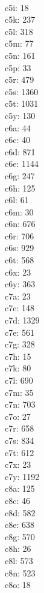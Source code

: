 \begin{multicols}{8}
  \\ c5i: 18
  \\ c5k: 237
  \\ c5l: 318
  \\ c5m: 77
  \\ c5n: 161
  \\ c5p: 33
  \\ c5r: 479
  \\ c5s: 1360
  \\ c5t: 1031
  \\ c5y: 130
  \\ c6a: 44
  \\ c6c: 40
  \\ c6d: 871
  \\ c6e: 1144
  \\ c6g: 247
  \\ c6h: 125
  \\ c6l: 61
  \\ c6m: 30
  \\ c6n: 676
  \\ c6r: 706
  \\ c6s: 929
  \\ c6t: 568
  \\ c6x: 23
  \\ c6y: 363
  \\ c7a: 23
  \\ c7c: 148
  \\ c7d: 1329
  \\ c7e: 561
  \\ c7g: 328
  \\ c7h: 15
  \\ c7k: 80
  \\ c7l: 690
  \\ c7m: 35
  \\ c7n: 703
  \\ c7o: 27
  \\ c7r: 658
  \\ c7s: 834
  \\ c7t: 612
  \\ c7x: 23
  \\ c7y: 1192
  \\ c8a: 125
  \\ c8c: 46
  \\ c8d: 582
  \\ c8e: 638
  \\ c8g: 570
  \\ c8h: 26
  \\ c8l: 573
  \\ c8n: 523
  \\ c8o: 18

\end{multicols}
